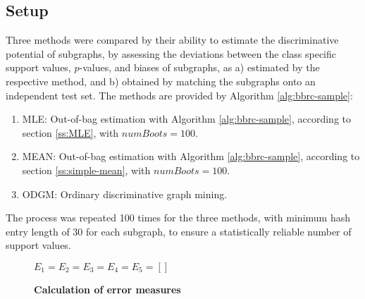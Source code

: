 \documentclass{sig-alternate}
\begin{document}
\subsection{Setup} 
\label{ss:Error-estimation} 
Three methods were compared by their ability to estimate the discriminative
potential of subgraphs, by assessing the deviations between the class specific
support values, $p$-values, and biases of subgraphs, as a) estimated by the respective
method, and b) obtained by matching the subgraphs onto an independent test set.
The methods are provided by Algorithm \ref{alg:bbrc-sample}:
\begin{enumerate} 
  \item MLE: Out-of-bag estimation with Algorithm \ref{alg:bbrc-sample}, according
    to section \ref{ss:MLE}, with $numBoots=100$.
  \item MEAN: Out-of-bag estimation with Algorithm \ref{alg:bbrc-sample}, according
    to section \ref{ss:simple-mean}, with $numBoots=100$.
  \item ODGM: Ordinary discriminative graph mining.
\end{enumerate}

The process was repeated 100 times for the three methods, with minimum hash entry length 
of 30 for each subgraph, to ensure a statistically reliable number of support values. 

\begin{figure*}[t]
  \begin{minipage}[h]{.59\textwidth}
    \begin{algorithm2e}[H]
      \fontsize{8}{10}
      \selectfont
      $E_1 =  E_2 =  E_3 =  E_4 =  E_5 =  \left[ \right]$\;
      \caption{\textbf{Calculation of error measures}\label{alg:pValEstimate}}
    \end{algorithm2e}
  \end{minipage}
  \begin{minipage}[h]{.39\textwidth}
    
  \end{minipage}
\end{figure*}
\end{document}
